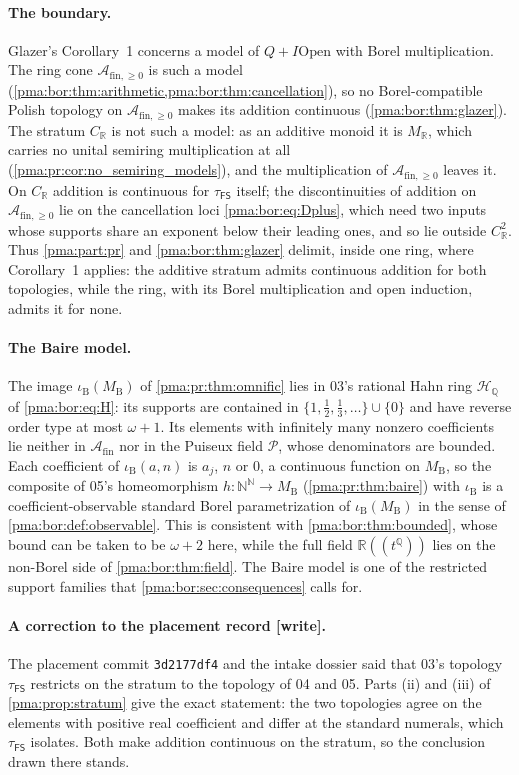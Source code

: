 \documentclass[11pt]{article}
\numberwithin{equation}{section}
\theoremstyle{definition}
\theoremstyle{remark}
\newcommand{\N}{\mathbb N}
\newcommand{\Q}{\mathbb Q}
\newcommand{\R}{\mathbb R}
\newcommand{\Baire}{\N^{\N}}
\newcommand{\MR}{M_{\R}}
\newcommand{\MB}{M_{\mathrm B}}
\newcommand{\FS}{\mathsf{FS}}
\newcommand{\Pui}{\mathcal P}
\newcommand{\A}{\mathcal A_{\mathrm{fin}}}
\newcommand{\PP}{\mathcal A_{\mathrm{fin},\geq 0}}
\newcommand{\HQ}{\mathcal H_{\Q}}
\newcommand{\writetag}{\textup{\textsf{\small[write]}}}
\begin{document}
\paragraph{The boundary.} Glazer's Corollary~1 concerns a model of
$Q+I\mathrm{Open}$ with Borel multiplication. The ring cone $\PP$ is such a
model (\cref{pma:bor:thm:arithmetic,pma:bor:thm:cancellation}), so no
Borel-compatible Polish topology on $\PP$ makes its addition continuous
(\cref{pma:bor:thm:glazer}). The stratum $C_{\R}$ is not such a model: as an
additive monoid it is $\MR$, which carries no unital semiring multiplication at
all (\cref{pma:pr:cor:no_semiring_models}), and the multiplication of $\PP$
leaves it. On $C_{\R}$ addition is continuous for $\tau_{\FS}$ itself; the
discontinuities of addition on $\PP$ lie on the cancellation loci
\eqref{pma:bor:eq:Dplus}, which need two inputs whose supports share an
exponent below their leading ones, and so lie outside $C_{\R}^2$. Thus
\cref{pma:part:pr} and \cref{pma:bor:thm:glazer} delimit, inside one ring,
where Corollary~1 applies: the additive stratum admits continuous addition
for both topologies, while the ring, with its Borel multiplication and open
induction, admits it for none.

\paragraph{The Baire model.} The image $\iota_{\mathrm B}(\MB)$ of
\cref{pma:pr:thm:omnific} lies in 03's rational Hahn ring $\HQ$ of
\eqref{pma:bor:eq:H}: its supports are contained in
$\{1,\tfrac12,\tfrac13,\dots\}\cup\{0\}$ and have reverse order type at most
$\omega+1$. Its elements with infinitely many nonzero coefficients lie neither
in $\A$ nor in the Puiseux field $\Pui$, whose denominators are bounded. Each
coefficient of $\iota_{\mathrm B}(a,n)$ is $a_j$, $n$ or $0$, a continuous
function on $\MB$, so the composite of 05's homeomorphism
$h:\Baire\to\MB$ (\cref{pma:pr:thm:baire}) with $\iota_{\mathrm B}$ is a
coefficient-observable standard Borel parametrization of
$\iota_{\mathrm B}(\MB)$ in the sense of \cref{pma:bor:def:observable}. This is
consistent with \cref{pma:bor:thm:bounded}, whose bound can be taken to be
$\omega+2$ here, while the full field $\R((t^{\Q}))$ lies on the non-Borel
side of \cref{pma:bor:thm:field}. The Baire model is one of the restricted
support families that \cref{pma:bor:sec:consequences} calls for.

\paragraph{A correction to the placement record \writetag.} The placement
commit \texttt{3d2177df4} and the intake dossier said that 03's topology
$\tau_{\FS}$ restricts on the stratum to the topology of 04 and 05. Parts
(ii) and (iii) of \cref{pma:prop:stratum} give the exact statement: the two
topologies agree on the elements with positive real coefficient and differ at
the standard numerals, which $\tau_{\FS}$ isolates. Both make addition
continuous on the stratum, so the conclusion drawn there stands.
\end{document}
